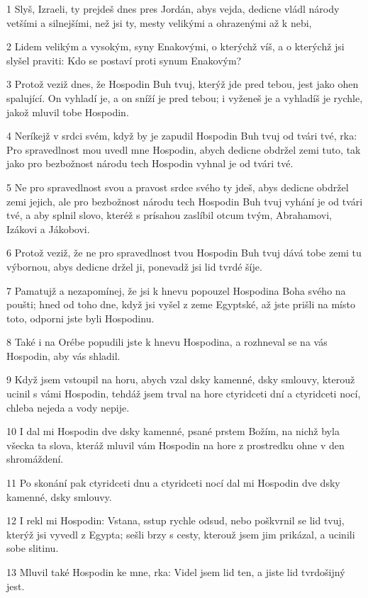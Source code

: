 \par 1 Slyš, Izraeli, ty prejdeš dnes pres Jordán, abys vejda, dedicne vládl národy vetšími a silnejšími, než jsi ty, mesty velikými a ohrazenými až k nebi,
\par 2 Lidem velikým a vysokým, syny Enakovými, o kterýchž víš, a o kterýchž jsi slyšel praviti: Kdo se postaví proti synum Enakovým?
\par 3 Protož veziž dnes, že Hospodin Buh tvuj, kterýž jde pred tebou, jest jako ohen spalující. On vyhladí je, a on sníží je pred tebou; i vyženeš je a vyhladíš je rychle, jakož mluvil tobe Hospodin.
\par 4 Neríkejž v srdci svém, když by je zapudil Hospodin Buh tvuj od tvári tvé, rka: Pro spravedlnost mou uvedl mne Hospodin, abych dedicne obdržel zemi tuto, tak jako pro bezbožnost národu tech Hospodin vyhnal je od tvári tvé.
\par 5 Ne pro spravedlnost svou a pravost srdce svého ty jdeš, abys dedicne obdržel zemi jejich, ale pro bezbožnost národu tech Hospodin Buh tvuj vyhání je od tvári tvé, a aby splnil slovo, kteréž s prísahou zaslíbil otcum tvým, Abrahamovi, Izákovi a Jákobovi.
\par 6 Protož veziž, že ne pro spravedlnost tvou Hospodin Buh tvuj dává tobe zemi tu výbornou, abys dedicne držel ji, ponevadž jsi lid tvrdé šíje.
\par 7 Pamatujž a nezapomínej, že jsi k hnevu popouzel Hospodina Boha svého na poušti; hned od toho dne, když jsi vyšel z zeme Egyptské, až jste prišli na místo toto, odporni jste byli Hospodinu.
\par 8 Také i na Orébe popudili jste k hnevu Hospodina, a rozhneval se na vás Hospodin, aby vás shladil.
\par 9 Když jsem vstoupil na horu, abych vzal dsky kamenné, dsky smlouvy, kterouž ucinil s vámi Hospodin, tehdáž jsem trval na hore ctyridceti dní a ctyridceti nocí, chleba nejeda a vody nepije.
\par 10 I dal mi Hospodin dve dsky kamenné, psané prstem Božím, na nichž byla všecka ta slova, kteráž mluvil vám Hospodin na hore z prostredku ohne v den shromáždení.
\par 11 Po skonání pak ctyridceti dnu a ctyridceti nocí dal mi Hospodin dve dsky kamenné, dsky smlouvy.
\par 12 I rekl mi Hospodin: Vstana, sstup rychle odsud, nebo poškvrnil se lid tvuj, kterýž jsi vyvedl z Egypta; sešli brzy s cesty, kterouž jsem jim prikázal, a ucinili sobe slitinu.
\par 13 Mluvil také Hospodin ke mne, rka: Videl jsem lid ten, a jiste lid tvrdošijný jest.
